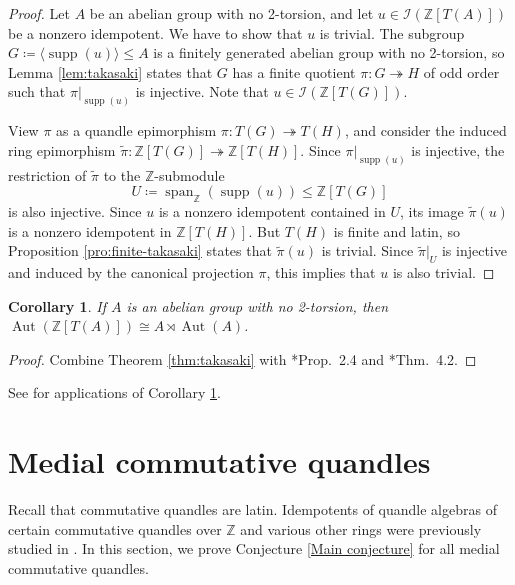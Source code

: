 \documentclass[12pt]{amsart}
\newtheorem{cor}[thm]{Corollary}
\theoremstyle{definition}
\theoremstyle{remark}
\newcommand{\Z}{\mathbb{Z}}
\newcommand{\I}{\mathcal{I}}
\newcommand{\supp}{\operatorname{supp}}
\def\Aut{\operatorname{Aut}}
\begin{document}
\begin{proof}
    Let $A$ be an abelian group with no 2-torsion, and let $u\in\I(\Z[T(A)])$ be a nonzero idempotent. We have to show that $u$ is trivial. The subgroup $G\coloneq\langle\supp (u)\rangle\leq A$ is a finitely generated abelian group with no 2-torsion, so Lemma \ref{lem:takasaki} states that $G$ has a finite quotient $\pi\colon G\twoheadrightarrow H$ of odd order such that $\pi|_{\supp (u)}$ is injective. Note that $u\in \I(\Z[T(G)])$.

    View $\pi$ as a quandle epimorphism $\pi\colon T(G)\twoheadrightarrow T(H)$, and consider the induced ring epimorphism $\widetilde{\pi}\colon\Z[T(G)]\twoheadrightarrow\Z[T(H)]$. Since $\pi|_{\supp (u)}$ is injective, the restriction of $\widetilde{\pi}$ to the $\Z$-submodule \[U\coloneq \operatorname{span}_\Z(\supp(u))\leq \Z[T(G)]\] is also injective. Since $u$ is a nonzero idempotent contained in $U$, its image $\widetilde{\pi}(u)$ is a nonzero idempotent in $\Z[T(H)]$. But $T(H)$ is finite and latin, so Proposition \ref{pro:finite-takasaki} states that $\widetilde{\pi}(u)$ is trivial. Since $\widetilde{\pi}|_U$ is injective and induced by the canonical projection $\pi$, this implies that $u$ is also trivial.
\end{proof}


\begin{cor}\label{cor:aut-tak}
    If $A$ is an abelian group with no 2-torsion, then $\Aut(\Z[T(A)])\cong A\rtimes \Aut(A)$.
\end{cor}

\begin{proof}
    Combine Theorem \ref{thm:takasaki} with \cite{bardakov-elhamdadi-2026}*{Prop.\ 2.4} and \cite{bardakov-2017}*{Thm.\ 4.2}.
\end{proof}

See \cite{ta-2} for applications of Corollary \ref{cor:aut-tak}.


\section{Medial commutative quandles}\label{sec:medial-comm}

Recall that commutative quandles are latin. Idempotents of quandle algebras of certain commutative quandles over $\Z$ and various other rings were previously studied in . In this section, we prove Conjecture \ref{Main conjecture} for all medial commutative quandles. 
\end{document}

